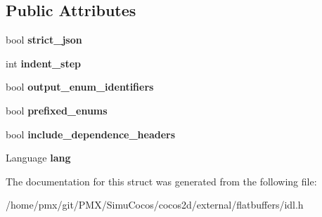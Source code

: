 \subsection*{Public Attributes}
\begin{DoxyCompactItemize}
\item 
\mbox{\label{structflatbuffers_1_1GeneratorOptions_a00a150d4548090954abb739322719757}} 
bool {\bfseries strict\+\_\+json}
\item 
\mbox{\label{structflatbuffers_1_1GeneratorOptions_a78d91b6775b1c9b6773875e669aa0b60}} 
int {\bfseries indent\+\_\+step}
\item 
\mbox{\label{structflatbuffers_1_1GeneratorOptions_a36b25afcd0826eebd3da7213d73c5067}} 
bool {\bfseries output\+\_\+enum\+\_\+identifiers}
\item 
\mbox{\label{structflatbuffers_1_1GeneratorOptions_ac030dfaf27e6336c3ba805b5a72c233e}} 
bool {\bfseries prefixed\+\_\+enums}
\item 
\mbox{\label{structflatbuffers_1_1GeneratorOptions_aa377e95e080bbae39a0e55b54c28165e}} 
bool {\bfseries include\+\_\+dependence\+\_\+headers}
\item 
\mbox{\label{structflatbuffers_1_1GeneratorOptions_a94f2bd79251e3065c71a0224b4c87d7f}} 
Language {\bfseries lang}
\end{DoxyCompactItemize}


The documentation for this struct was generated from the following file\+:\begin{DoxyCompactItemize}
\item 
/home/pmx/git/\+P\+M\+X/\+Simu\+Cocos/cocos2d/external/flatbuffers/idl.\+h\end{DoxyCompactItemize}
